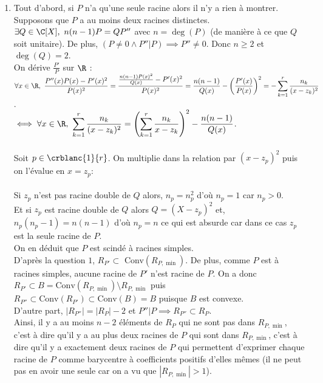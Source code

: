 \documentclass{book}
\begin{document}
\begin{enumerate}
		Et si $\nu_p=1$ alors $\forall k\in \crblanc{1}{m}\setminus\{p\},\ \nu_k=0$. D'où, comme $0<t<1$, $\forall k\in \crblanc{1}{m}\setminus\{p\},\ \lambda_k=\mu_k=0$ d'où $a=b=z_p$. Ceci est absurde car $a\notin R_{P,\min}$ par exemple.\\\\
		Ainsi, $\gamma(t)\notin R_{P,\min}$ et donc Conv$(R_P)\setminus R_{P,\min}$ est convexe.
		\item Tout d'abord, si $P$ n'a qu'une seule racine alors il n'y a rien à montrer. Supposons que $P$ a au moins deux racines distinctes. $\exists Q\in \C[X],\ n(n-1)P=QP''$ avec $n=\deg(P)$ (de manière à ce que $Q$ soit unitaire). De plus, $(P\ne 0\land P''|P)\implies P''\ne 0$. Donc $n\geq 2$ et $\deg(Q)=2$.\\
		On dérive $\displaystyle\frac{P'}{P}$ sur $\R$ :\\
		$\forall x\in \R,\ \displaystyle\frac{P''(x)P(x)-P'(x)^2}{P(x)^2}=\frac{\frac{n(n-1)P(x)^2}{Q(x)}-P'(x)^2}{P(x)^2}=\frac{n(n-1)}{Q(x)}-\left(\frac{P'(x)}{P(x)}\right)^2=-\sum\limits_{k=1}^r\frac{n_k}{(x-z_k)^2}$.\\
		$\iff \forall x\in \R,\ \displaystyle\sum\limits_{k=1}^r\frac{n_k}{(x-z_k)^2}=\left(\sum\limits_{k=1}^r{\frac{n_k}{x-z_k}}\right)^2-\frac{n(n-1)}{Q(x)}$.\\\\
		Soit $p\in \crblanc{1}{r}$. On multiplie dans la relation par $(x-z_p)^2$ puis on l'évalue en $x=z_p$:\\\\
		Si $z_p$ n'est pas racine double de $Q$ alors, $n_p=n_p^2$ d'où $n_p=1$ car $n_p>0$.\\
		Et si $z_p$ est racine double de $Q$ alors $Q=(X-z_p)^2$ et, $n_p(n_p-1)=n(n-1)$ d'où $n_p=n$ ce qui est absurde car dans ce cas $z_p$ est la seule racine de $P$.\\
		On en déduit que $P$ est scindé à racines simples.\\
		D'après la question $1$, $R_{P'}\subset$ Conv$(R_{P,\min})$. De plus, comme $P$ est à racines simples, aucune racine de $P'$ n'est racine de $P$. On a donc $R_{P'}\subset B=\text{Conv}(R_{P,\min})\setminus R_{P,\min}$ puis $R_{P''}\subset \text{Conv}(R_{P'})\subset \text{Conv}(B)=B$ puisque $B$ est convexe.\\
		D'autre part, $|R_{P''}|=|R_P|-2$ et $P''|P\implies R_{P''}\subset R_P$.\\
		Ainsi, il y a au moins $n-2$ éléments de $R_P$ qui ne sont pas dans $R_{P,\min}$, c'est à dire qu'il y a au plus deux racines de $P$ qui sont dans $R_{P,\min}$, c'est à dire qu'il y a exactement deux racines de $P$ qui permettent d'exprimer chaque racine de $P$ comme barycentre à coefficients positifs d'elles mêmes (il ne peut pas en avoir une seule car on a vu que $|R_{P,\min}|>1$).\\

\end{enumerate}
\end{document}

